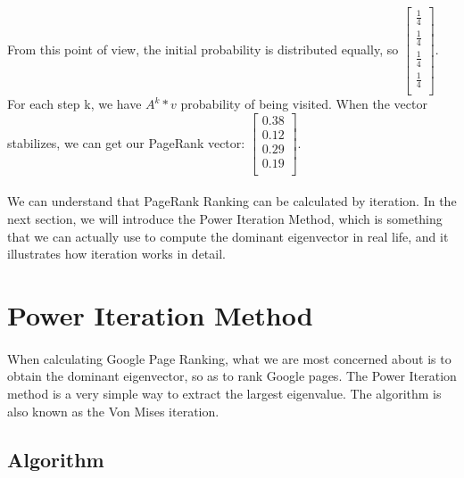 \documentclass[12pt]{article}
\begin{document}
\begin{itemize}
\paragraph{}From this point of view, the initial probability is distributed equally, so $\begin{bmatrix}\frac{1}{4} \\\frac{1}{4} \\\frac{1}{4} \\\frac{1}{4} \\\end{bmatrix}$. For each step k, we have $A^k*v$ probability of being visited. When the vector stabilizes, we can get our PageRank vector: $\begin{bmatrix}0.38 \\0.12 \\0.29 \\0.19 \\\end{bmatrix}$.
    
\end{itemize}

\paragraph{} We can understand that PageRank Ranking can be calculated by iteration. In the next section, we will introduce the Power Iteration Method, which is something that we can actually use to compute the dominant eigenvector in real life, and it illustrates how iteration works in detail.



\section{Power Iteration Method}

\paragraph{}When calculating Google Page Ranking, what we are most concerned about is to obtain the dominant eigenvector, so as to rank Google pages. The Power Iteration method is a very simple way to extract the largest eigenvalue. The algorithm is also known as the Von Mises iteration. 

\subsection{Algorithm}
\end{document}
